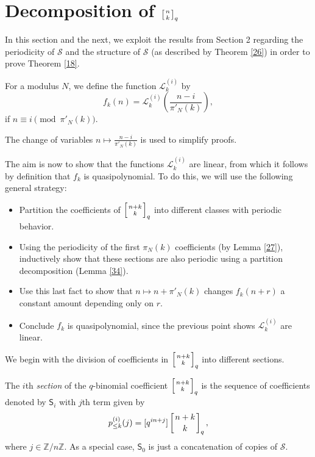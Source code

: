 \documentclass[12pt]{article}
\newcommand{\qbinom}[2]{\left[{#1 \atop #2}\right]_q}
\begin{document}
\section[Decomposition into sections]{Decomposition of $\qbinom{n}{k}$}

In this section and the next, we exploit the results from Section 2 regarding the periodicity of $\mathcal{S}$ and the structure of $\mathcal{S}$ (as described by Theorem \ref{26}) in order to prove Theorem \ref{18}.

\begin{definition}
For a modulus $N$, we define the function $\mathcal{L}_{k}^{(i)}$ by
$$f_{k}(n) = \mathcal{L}_{k}^{(i)}\left( \frac{n-i}{\pi'_N(k)}\right),$$
if $n\equiv i \pmod{\pi'_N(k)}$.
\label{31}
\end{definition}

\begin{remark}
The change of variables $n \mapsto \frac{n-i}{\pi'_{N}(k)}$ is used to simplify proofs.
\end{remark}
The aim is now to show that the functions $\mathcal{L}_{k}^{(i)}$ are linear, from which it follows by definition that $f_{k}$ is quasipolynomial. To do this, we will use the following general strategy:

\begin{itemize}
\item Partition the coefficients of $\qbinom{n+k}{k}$ into different classes with periodic behavior.
\item Using the periodicity of the first $\pi_N(k)$ coefficients (by Lemma \ref{27}), inductively show that these sections are also periodic using a partition decomposition (Lemma \ref{34}).
\item Use this last fact to show that $n \mapsto n+\pi'_N(k)$ changes $f_{k}(n+r)$ a constant amount depending only on $r$.
\item Conclude $f_{k}$ is quasipolynomial, since the previous point shows $\mathcal{L}_{k}^{(i)}$ are linear.
\end{itemize}

We begin with the division of coefficients in $\qbinom{n+k}{k}$ into different sections.

\begin{definition}
The $i$th \textit{section} of the $q$-binomial coefficient $\qbinom{n+k}{k}$ is the sequence of coefficients denoted by $\mathsf{S}_i$ with $j$th term given by
\[p_{\le k}^{(i)}(j) = [q^{in+j}]\qbinom{n+k}{k},\]
where $j\in \mathbb{Z}/n\mathbb{Z}$. As a special case, $\mathsf{S}_0$ is just a concatenation of copies of $\mathcal{S}$.
\label{32}
\end{definition}
\end{document}
